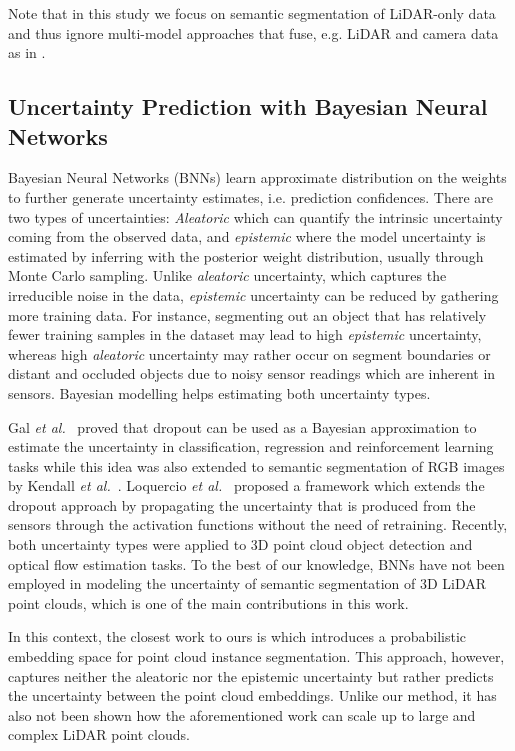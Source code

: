 \documentclass[letterpaper, 10 pt, conference]{ieeeconf}
\makeatletter
\def\eg{e.g.\@\xspace}
\def\ie{i.e.\@\xspace}
\makeatother
\begin{document}
Note that in this study we focus on semantic segmentation of LiDAR-only data and thus ignore multi-model approaches that fuse,  \eg LiDAR and camera data as   in \cite{Frustum2017}. 



 
\subsection{Uncertainty Prediction with Bayesian Neural Networks}
Bayesian Neural Networks (BNNs) learn approximate distribution on the weights  to further generate uncertainty estimates, \ie prediction confidences.
There are two types of uncertainties: \textit{Aleatoric} which can quantify the intrinsic uncertainty coming from the observed data,  and \textit{epistemic} where the model uncertainty is estimated by inferring with the posterior weight distribution, usually through Monte Carlo sampling. 
Unlike \textit{aleatoric} uncertainty, which captures the irreducible noise in the data, \textit{epistemic} uncertainty can be reduced by gathering more training data.
For instance, segmenting out an object that has relatively fewer training samples in the dataset may lead to high \textit{epistemic} uncertainty, whereas high \textit{aleatoric} uncertainty may rather occur on segment boundaries or distant and occluded objects due to noisy sensor readings which are inherent in sensors.
Bayesian modelling helps estimating both uncertainty types.





Gal \textit{et al.}~\cite{gal2016dropout} proved that dropout can be used as a Bayesian approximation to estimate the uncertainty in classification, regression and reinforcement learning tasks while this idea was also extended to semantic segmentation of RGB images by Kendall \textit{et al.}~\cite{kendall2015bayesian}. 
Loquercio \textit{et al.}~\cite{segu2019general} proposed a framework which extends the dropout approach by propagating the uncertainty that is produced from the sensors through the activation functions without the need of retraining.
Recently, both uncertainty types were applied to 3D point cloud object detection \cite{feng2018towards} and   optical flow estimation \cite{ilg2018uncertainty} tasks. 
To the best of our knowledge, BNNs have not been employed in modeling the uncertainty of semantic segmentation of 3D LiDAR point clouds, which is one of the main contributions in this work.


In this context, the closest work to ours is \cite{Zhang2019} which introduces a probabilistic  embedding space for point cloud instance segmentation. This approach, however, captures neither the aleatoric nor the epistemic uncertainty but rather predicts the uncertainty between the point cloud embeddings.
Unlike our method, it has also not been shown how the aforementioned work can scale up to large and complex LiDAR point clouds. 
\end{document}

